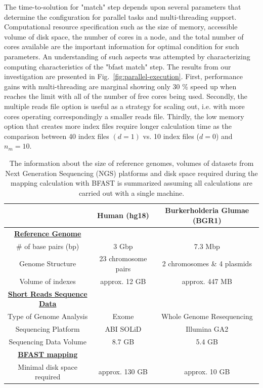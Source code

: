 \documentclass[12pt]{article}
\begin{document}
The time-to-solution for "match" step depends upon several parameters that determine the configuration for parallel tasks and multi-threading support.  Computational resource specification such as the size of memory, accessible volume of disk space, the number of cores in a node, and the total number of cores available are the important information for optimal condition for such parameters.  An understanding of such aspects was attempted by characterizing computing characteristics of the "bfast match" step.  The results from our investigation are presented  in Fig.~\ref{fig:parallel-execution}. First, performance gains with multi-threading are marginal showing only 30 \% speed up when reaches the limit with all of the number of free cores being used.  
Secondly, the multiple reads file option is useful as a strategy for scaling out, i.e. with more cores operating correspondingly a smaller reads file.  Thirdly, the low memory option that creates more index files require longer calculation time as the comparison between 40 index files $(d = 1)$ vs. 10 index files ($ d = 0 $) and $n_m = 10$.   





\begin{table}
\begin{tabular}{|ccc|} 
  \hline 
   & Human (hg18) & Burkerholderia Glumae (BGR1)  \\ \hline
 \underline{\textbf{Reference Genome}}   \\
    \# of base pairs (bp) &  3 Gbp & 7.3 Mbp \\
   Genome Structure &   23 chromosome pairs  & 2 chromosomes \& 4 plasmids  \\  
    Volume of indexes  & approx. 12 GB  & approx. 447 MB  \\
    \underline{ \textbf{Short Reads Sequence Data}}   \\
  Type of Genome Analysis &  Exome  & Whole Genome Resequencing \\
  Sequencing Platform & ABI SOLiD  &  Illumina GA2 \\
  Sequencing Data Volume  & 8.7 GB & 5.4 GB \\
  \underline{ \textbf{BFAST mapping} }  \\
  Minimal disk space required  &  approx. 130 GB   &    approx. 10 GB   \\

\hline
\end{tabular} \caption{The information about the size of reference genomes, volumes of datasets from Next Generation Sequencing (NGS) platforms and disk space required during the mapping calculation with BFAST is summarized assuming all calculations are carried out with a single machine.}
 \label{table:two-genomes} 
\end{table}
\end{document}
